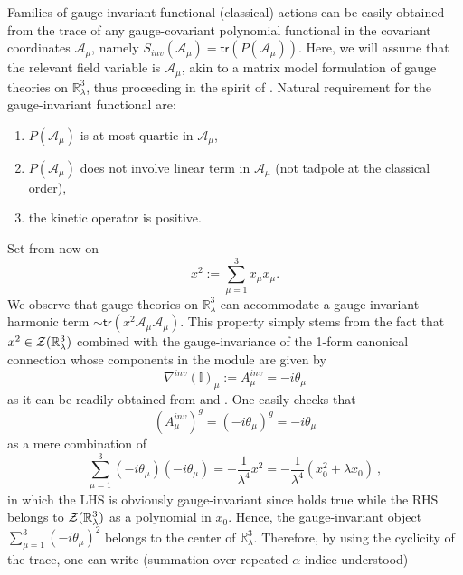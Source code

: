 \documentclass[10pt]{book}
\newcommand{\tr}{\mathsf{tr}}
\theoremstyle{break}
\begin{document}
Families of gauge-invariant functional (classical) actions can be easily obtained from the trace of any gauge-covariant polynomial functional in the covariant coordinates $\mathcal{A}_\mu$, namely $S_{inv}(\mathcal{A}_\mu)=\tr\left(P(\mathcal{A}_\mu)\right)$. Here, we will assume that the relevant field variable is $\mathcal{A}_\mu$, akin to a matrix model formulation of gauge theories on $\mathbb{R}^3_\lambda$, thus proceeding in the spirit of %
. Natural requirement for the gauge-invariant functional are:
\begin{enumerate}
\item $P(\mathcal{A}_\mu)$ is at most quartic in $\mathcal{A}_\mu$,
\item $P(\mathcal{A}_\mu)$ does not involve linear term in $\mathcal{A}_\mu$ (not tadpole at the classical order),
\item the kinetic operator is positive.
\end{enumerate}
Set from now on 
\begin{equation*}
x^2 := \sum_{\mu=1}^3x_\mu x_\mu. 
\end{equation*}
We observe that gauge theories on $\mathbb{R}^3_\lambda$ can accommodate a 
gauge-invariant harmonic term $\sim\tr(x^2\mathcal{A}_\mu \mathcal{A}_\mu)$. This property simply stems from the fact that $x^2\in{\cal{Z}}(\mathbb{R}^3_\lambda)$ combined with the gauge-invariance of the 1-form canonical connection whose components in the module are given by 
\begin{equation}
\nabla^{inv}( \mathbb{I})_\mu:=A^{inv}_\mu=-i\theta_\mu%
\end{equation}
as it can be readily obtained from %
and %
. One easily checks that 
\begin{equation}
(A^{inv}_\mu)^g=(-i\theta_\mu)^g=-i\theta_\mu%
\end{equation}
as a mere combination of %
\begin{equation}
\sum_{\mu=1}^3(-i\theta_\mu)(-i\theta_\mu ) = -\frac{1}{\lambda^4}x^2 = -\frac{1}{\lambda^4}(x_0^2+\lambda x_0) \ , %
\end{equation}
in which the LHS is obviously gauge-invariant since %
holds true while the RHS belongs to ${\cal{Z}}(\mathbb{R}^3_\lambda)$ as a polynomial in $x_0$. Hence, the gauge-invariant object $\sum_{\mu=1}^3(-i\theta_\mu)^2$ belongs to the center of $\mathbb{R}^3_\lambda$. Therefore, by using the cyclicity of the trace, one can write (summation over repeated $\alpha$ indice understood) %
\end{document}
